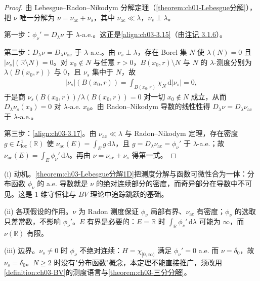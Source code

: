 \documentclass[../../main.tex]{subfiles}%
\begin{document}
\begin{proof}
由 Lebesgue--Radon--Nikodym 分解定理（\cref{theorem:ch01-Lebesgue分解}），把 $\nu$ 唯一分解为 $\nu=\nu_{\mathrm{ac}}+\nu_s$，其中 $\nu_{\mathrm{ac}}\ll\lambda$，$\nu_s\perp\lambda$。

第一步：$\phi_\nu'=D_\lambda\nu$ 于 $\lambda$-a.e.。这正是\eqref{align:ch03-3.15}（由\hyperref[remark:ch03-RN导数]{注记 3.1.6}）。

第二步：$D_\lambda\nu=D_\lambda\nu_{\mathrm{ac}}$ 于 $\lambda$-a.e.。由 $\nu_s\perp\lambda$，存在 Borel 集 $N$ 使 $\lambda(N)=0$ 且 $|\nu_s|(\mathbb{R}\setminus N)=0$。对 $x_0\notin N$ 与任意 $r>0$，$B(x_0,r)\setminus N$ 与 $N$ 的 $\lambda$-测度分别为 $\lambda(B(x_0,r))$ 与 $0$，且 $\nu_s$ 集中于 $N$，故
\begin{align*}
|\nu_s|(B(x_0,r))=\int_{B(x_0,r)}\chi_N\,\mathrm{d}|\nu_s|=0,
\end{align*}
于是商 $\nu_s(B(x_0,r))/\lambda(B(x_0,r))=0$ 对一切 $x_0\notin N$ 成立，从而 $D_\lambda\nu_s(x_0)=0$ 对 $\lambda$-a.e. $x_0$。由 Radon--Nikodym 导数的线性性得 $D_\lambda\nu=D_\lambda\nu_{\mathrm{ac}}$ 于 $\lambda$-a.e.。

第三步：\eqref{align:ch03-3.17}。由 $\nu_{\mathrm{ac}}\ll\lambda$ 与 Radon--Nikodym 定理，存在密度 $g\in L^1_{\mathrm{loc}}(\mathbb{R})$ 使 $\nu_{\mathrm{ac}}(E)=\int_Eg\,\mathrm{d}\lambda$，且 $g=D_\lambda\nu_{\mathrm{ac}}=\phi_\nu'$ 于 $\lambda$-a.e.；故 $\nu_{\mathrm{ac}}(E)=\int_E\phi_\nu'\,\mathrm{d}\lambda$。再由 $\nu=\nu_{\mathrm{ac}}+\nu_s$ 得第一式。
\end{proof}

\begin{remark}\label{remark:ch03-Lebesgue分解1D动机}
(i) 动机。\cref{theorem:ch03-Lebesgue分解1D}把测度分解与函数可微性合为一体：分布函数 $\phi_\nu$ 的 a.e. 导数就是 $\nu$ 的绝对连续部分的密度，而奇异部分在导数中不可见。这是 $1$ 维守恒律与 $BV$ 理论中追踪跳跃的基础。

(ii) 各项假设的作用。$\nu$ 为 Radon 测度保证 $\phi_\nu$ 局部有界、$\nu_{\mathrm{ac}}$ 有密度；$\phi_\nu$ 的选取只差常数，不影响 $\phi_\nu'$。$E$ 有界是必要的：$E=\mathbb{R}$ 时 $\int_{\mathbb{R}}\phi_\nu'\,\mathrm{d}\lambda$ 可能为 $\infty$，而 $\nu(\mathbb{R})$ 有限。

(iii) 边界。$\nu_s\neq0$ 时 $\phi_\nu$ 不绝对连续：$H=\chi_{[0,\infty)}$ 满足 $\phi_\nu'=0$ a.e. 而 $\nu=\delta_0$，故 $\nu_s=\delta_0$。$N\geqslant2$ 时没有"分布函数"概念，本定理不能直接推广，须改用\cref{definition:ch03-BV}的测度语言与\cref{theorem:ch03-三分分解}。
\end{remark}
\end{document}
